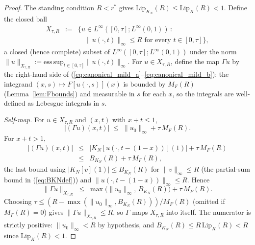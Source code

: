 \documentclass[amsthm]{autart}
\theoremstyle{plain}
\theoremstyle{definition}
\newcommand{\Linf}{L^\infty}
\newcommand{\Lipk}{\mathrm{Lip}_K}
\newcommand{\LipKn}{\mathrm{Lip}_{K_N}}
\begin{document}
\begin{proof}
The standing condition $R < r^*$ gives $\LipKn(R) \le \Lipk(R) < 1$. Define the closed ball
\begin{eqnarray}
X_{\tau, R} &:=& \bigl\{u \in \Linf([0,\tau]; \Linf(0,1)) \,:\, \nonumber \\
&& \quad \|u(\cdot, t)\|_\infty \le R \text{ for every } t \in [0,\tau]\bigr\},
\label{eq:Xtau}
\end{eqnarray}
a closed (hence complete) subset of $\Linf([0,\tau]; \Linf(0,1))$ under the norm $\|u\|_{X_{\tau,R}} := \mathrm{ess\,sup}_{t \in [0,\tau]}\|u(\cdot, t)\|_\infty$. For $u \in X_{\tau, R}$, define the map $\Gamma u$ by the right-hand side of (\ref{eq:canonical_mild_a}--\ref{eq:canonical_mild_b}); the integrand $(x, s) \mapsto F[u(\cdot, s)](x)$ is bounded by $M_F(R)$ (Lemma~\ref{lem:Fbounds}) and measurable in $s$ for each $x$, so the integrals are well-defined as Lebesgue integrals in $s$.

\emph{Self-map.} For $u \in X_{\tau, R}$ and $(x, t)$ with $x + t \le 1$,
\begin{equation}
|(\Gamma u)(x, t)| \;\le\; \|u_0\|_\infty + \tau\, M_F(R).
\label{eq:Gamma_interior}
\end{equation}
For $x + t > 1$,
\begin{eqnarray}
|(\Gamma u)(x, t)| &\le& |K_N[u(\cdot, t - (1-x))](1)| + \tau\, M_F(R) \nonumber \\
&\le& B_{K_N}(R) + \tau\, M_F(R),
\label{eq:Gamma_boundary}
\end{eqnarray}
the last bound using $|K_N[v](1)| \le B_{K_N}(R)$ for $\|v\|_\infty \le R$ (the partial-sum bound in (\ref{eq:BKNdef})) and $\|u(\cdot, t-(1-x))\|_\infty \le R$. Hence
\begin{equation}
\|\Gamma u\|_{X_{\tau, R}} \;\le\; \max\bigl(\|u_0\|_\infty,\, B_{K_N}(R)\bigr) + \tau\, M_F(R).
\label{eq:Gamma_selfmap_bound}
\end{equation}
Choosing $\tau \le (R - \max(\|u_0\|_\infty, B_{K_N}(R)))/M_F(R)$ (omitted if $M_F(R) = 0$) gives $\|\Gamma u\|_{X_{\tau, R}} \le R$, so $\Gamma$ maps $X_{\tau, R}$ into itself. The numerator is strictly positive: $\|u_0\|_\infty < R$ by hypothesis, and $B_{K_N}(R) \le R\, \Lipk(R) < R$ since $\Lipk(R) < 1$.


\end{proof}
\end{document}
